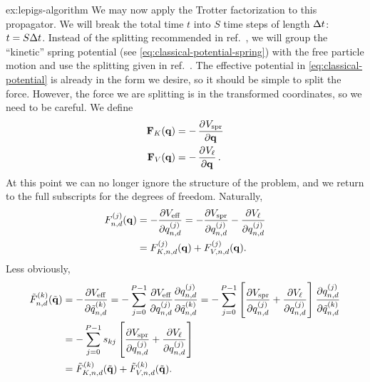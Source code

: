 \begin{DefAnswer}{ex:lepigs-algorithm}
	We may now apply the Trotter factorization to this propagator.
	We will break the total time $t$ into $S$ time steps of length $\Delta t$: $t = S \Delta t$.
	Instead of the splitting recommended in ref.~\cite{bussi2007accurate}, we will group the ``kinetic'' spring potential (see \cref{eq:classical-potential-spring}) with the free particle motion and use the splitting given in ref.~\cite{ceriotti2010efficient}.
	The effective potential in \cref{eq:classical-potential} is already in the form we desire, so it should be simple to split the force.
	However, the force we are splitting is in the transformed coordinates, so we need to be careful.
	We define
	\begin{subequations}
	\begin{align}
		\vec{F}_K(\vec{q})
		&= -\dpd{\Vspring}{\vec{q}} \\
		\vec{F}_V(\vec{q})
		&= -\dpd{V_\links}{\vec{q}}.
	\end{align}
	\end{subequations}
	At this point we can no longer ignore the structure of the problem, and we return to the full subscripts for the degrees of freedom.
	Naturally,
	\begin{subequations}
	\begin{align}
		F_{n,d}^{(j)}(\bm{\mathbf{q}})
		&= -\frac{\partial V_\mathrm{eff}}{\partial q_{n,d}^{(j)}}
		= -\frac{\partial V_\mathrm{spr}}{\partial q_{n,d}^{(j)}} - \frac{\partial V_\ell}{\partial q_{n,d}^{(j)}} \\
		&= F_{K,n,d}^{(j)}(\bm{\mathbf{q}}) + F_{V,n,d}^{(j)}(\bm{\mathbf{q}}).
	\end{align}
	\end{subequations}
	Less obviously,
	\begin{subequations}
	\begin{align}
		\nm{F}_{n,d}\bead{k}(\nm{\vec{q}})
		&= -\frac{\partial \Veff}{\partial \nm{q}_{n,d}\bead{k}}
		= -\sum_{j=0}^{P-1} \frac{\partial \Veff}{\partial q_{n,d}\bead{j}} \frac{\partial q_{n,d}\bead{j}}{\partial \nm{q}_{n,d}\bead{k}}
		= -\sum_{j=0}^{P-1} \left[ \frac{\partial \Vspring}{\partial q_{n,d}\bead{j}} + \frac{\partial V_\links}{\partial q_{n,d}\bead{j}} \right] \frac{\partial q_{n,d}\bead{j}}{\partial \nm{q}_{n,d}\bead{k}} \\
		&= -\sum_{j=0}^{P-1} s_{kj} \left[ \frac{\partial \Vspring}{\partial q_{n,d}\bead{j}} + \frac{\partial V_\links}{\partial q_{n,d}\bead{j}} \right]
				\label{eq:force-nm-transform} \\
		&= \nm{F}_{K,n,d}\bead{k}(\nm{\vec{q}}) + \nm{F}_{V,n,d}\bead{k}(\nm{\vec{q}}).

\end{align}
\end{subequations}
\end{DefAnswer}
